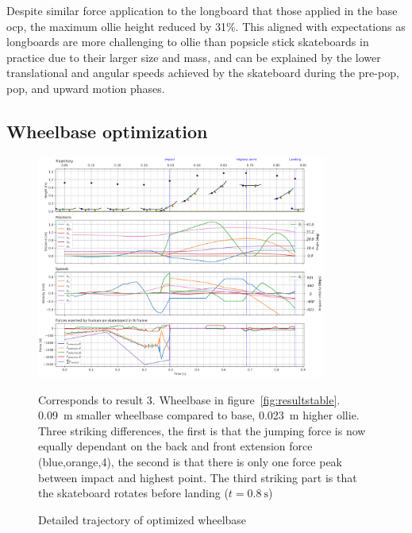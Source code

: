 \documentclass[default,iicol]{sn-jnl}
\begin{document}
Despite similar force application to the longboard that those applied in the base \gls{ocp}, the maximum ollie height reduced by 31\%. This aligned with expectations as longboards are more challenging to ollie than popsicle stick skateboards in practice due to their larger size and mass, and can be explained by the lower translational and angular speeds achieved by the skateboard during the pre-pop, pop, and upward motion phases.

\subsection{Wheelbase optimization}

\begin{figure}
    \centering
    \includegraphics[trim={0cm 0cm 0cm 0cm},clip,width=0.85\textwidth]{paper/figure/Results/data_l_wbdpi600 (1).png}    
    \caption[Trajectory, positions, speeds, and forces for wheelbase optimization]{Detailed trajectory of optimized wheelbase}\label{f_wheelbase}
    Corresponds to result 3. Wheelbase in figure~\ref{fig:resultstable}. \SI{0.09}{\meter} smaller wheelbase compared to base, \SI{0.023}{\meter} higher ollie. Three striking differences, the first is that the jumping force is now equally dependant on the back and front extension force (blue,orange,4), the second is that there is only one force peak between impact and highest point. The third striking part is that the skateboard rotates before landing ($t=\SI{0.8}{\second}$)
\end{figure}
\end{document}
